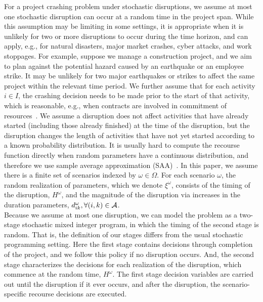 \documentclass[11pt]{article}
\newcommand{\cA}{{\cal A}}
\begin{document}
		\newline
		For a project crashing problem under stochastic disruptions, we assume at most one stochastic disruption can occur at a random time in the project span. While this assumption may be limiting in some settings, it is appropriate when it is unlikely for two or more disruptions to occur during the time horizon, and can apply, e.g., for natural disasters, major market crashes, cyber attacks, and work stoppages. For example, suppose we manage a construction project, and we aim to plan against the potential hazard caused by an earthquake or an employee strike. It may be unlikely for two major earthquakes or strikes to affect the same project within the relevant time period. We further assume that for each activity \(i \in I\), the crashing decision needs to be made prior to the start of that activity, which is reasonable, e.g., when contracts are involved in commitment of resources~\citep{oberlender1993project}. We assume a disruption does not affect activities that have already started (including those already finished) at the time of the disruption, but the disruption changes the length of activities that have not yet started according to a known probability distribution. It is usually hard to compute the recourse function directly when random parameters have a continuous distribution, and therefore we use sample average approximation (SAA)~\citep{kim2015guide,shapiro2009lectures}. In this paper, we assume there is a finite set of scenarios indexed by \(\omega \in \Omega\). For each scenario \(\omega\), the random realization of parameters, which we denote \(\xi^\omega\), consists of the timing of the disruption, \(H^\omega\), and the magnitude of the disruption via increases in the duration parameters, \(d^\omega_{ik}, \forall (i,k) \in \cA\). \\
		\newline
		Because we assume at most one disruption, we can model the problem as a two-stage stochastic mixed integer program, in which the timing of the second stage is random. That is, the definition of our stages differs from the usual stochastic programming setting. Here the first stage contains decisions through completion of the project, and we follow this policy if no disruption occurs. And, the second stage characterizes the decisions for each realization of the disruption, which commence at the random time, $H^\omega$. The first stage decision variables are carried out until the disruption if it ever occurs, and after the disruption, the scenario-specific recourse decisions are executed.\\
\end{document}
